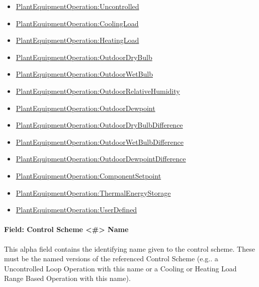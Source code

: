 \begin{itemize}
\item
  \hyperref[plantequipmentoperationuncontrolled]{PlantEquipmentOperation:Uncontrolled}
\item
  \hyperref[plantequipmentoperationcoolingload]{PlantEquipmentOperation:CoolingLoad}
\item
  \hyperref[plantequipmentoperationheatingload]{PlantEquipmentOperation:HeatingLoad}
\item
  \hyperref[plantequipmentoperationoutdoordrybulb]{PlantEquipmentOperation:OutdoorDryBulb}
\item
  \hyperref[plantequipmentoperationoutdoorwetbulb]{PlantEquipmentOperation:OutdoorWetBulb}
\item
  \hyperref[plantequipmentoperationoutdoorrelativehumidity]{PlantEquipmentOperation:OutdoorRelativeHumidity}
\item
  \hyperref[plantequipmentoperationoutdoordewpoint]{PlantEquipmentOperation:OutdoorDewpoint}
\item
  \hyperref[plantequipmentoperationoutdoordrybulbdifference]{PlantEquipmentOperation:OutdoorDryBulbDifference}
\item
  \hyperref[plantequipmentoperationoutdoorwetbulbdifference]{PlantEquipmentOperation:OutdoorWetBulbDifference}
\item
  \hyperref[plantequipmentoperationoutdoordewpointdifference]{PlantEquipmentOperation:OutdoorDewpointDifference}
\item
  \hyperref[plantequipmentoperationcomponentsetpoint]{PlantEquipmentOperation:ComponentSetpoint}
\item
  \hyperref[plantequipmentoperationthermalenergystorage]{PlantEquipmentOperation:ThermalEnergyStorage}
\item
  \hyperref[plantequipmentoperationuserdefined]{PlantEquipmentOperation:UserDefined}
\end{itemize}

\paragraph{Field: Control Scheme \textless{}\#\textgreater{} Name}\label{field-control-scheme-name}

This alpha field contains the identifying name given to the control scheme. These must be the named versions of the referenced Control Scheme (e.g.. a Uncontrolled Loop Operation with this name or a Cooling or Heating Load Range Based Operation with this name).

